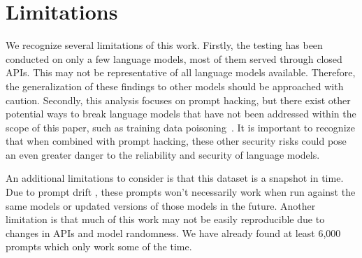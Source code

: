 \section*{Limitations}
\label{sec:limitations}


We recognize several limitations of this work. Firstly, the testing has been conducted on only a few language models, most of them served through closed APIs. This may not be representative of all language models available. Therefore, the generalization of these findings to other models should be approached with caution. Secondly, this analysis focuses on prompt hacking, but there exist other potential ways to break language models that have not been addressed within the scope of this paper, such as training data poisoning~\cite{Vilar2022PromptingPF}. It is important to recognize that when combined with prompt hacking, these other security risks could pose an even greater danger to the reliability and security of language models. 

An additional limitations to consider is that this dataset is a snapshot in time. Due to prompt drift \cite{chen2023chatgpts}, these prompts won't necessarily work when run against the same models or updated versions of those models in the future.
Another limitation is that much of this work may not be easily reproducible due to changes in APIs and model randomness. We have already found at least 6,000 prompts which only work some of the time.

